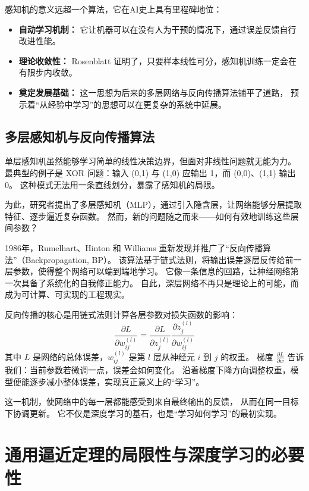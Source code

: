 感知机的意义远超一个算法，它在AI史上具有里程碑地位：
\begin{itemize}
\item {\bf 自动学习机制：} 它让机器可以在没有人为干预的情况下，通过误差反馈自行改进性能。
\item {\bf 理论收敛性：} Rosenblatt 证明了，只要样本线性可分，感知机训练一定会在有限步内收敛。
\item {\bf 奠定发展基础：} 这一思想为后来的多层网络与反向传播算法铺平了道路，  
预示着“从经验中学习”的思想可以在更复杂的系统中延展。
\end{itemize}

\subsection{多层感知机与反向传播算法}

单层感知机虽然能够学习简单的线性决策边界，但面对非线性问题就无能为力。  
最典型的例子是 XOR 问题：输入 (0,1) 与 (1,0) 应输出 1，而 (0,0)、(1,1) 输出 0。  
这种模式无法用一条直线划分，暴露了感知机的局限。  

为此，研究者提出了多层感知机（MLP），通过引入隐含层，让网络能够分层提取特征、逐步逼近复杂函数。  
然而，新的问题随之而来——如何有效地训练这些层间参数？  

1986年，Rumelhart、Hinton 和 Williams 重新发现并推广了“反向传播算法”（Backpropagation, BP）。  
该算法基于链式法则，将输出误差逐层反传给前一层参数，使得整个网络可以端到端地学习。  
它像一条信息的回路，让神经网络第一次具备了系统化的自我修正能力。  
自此，深层网络不再只是理论上的可能，而成为可计算、可实现的工程现实。

反向传播的核心是用链式法则计算各层参数对损失函数的影响：  
\begin{equation}
\frac{\partial L}{\partial w_{ij}^{(l)}} = \frac{\partial L}{\partial z_j^{(l)}} \frac{\partial z_j^{(l)}}{\partial w_{ij}^{(l)}}
\end{equation}
其中 $L$ 是网络的总体误差，$w_{ij}^{(l)}$ 是第 $l$ 层从神经元 $i$ 到 $j$ 的权重。  
梯度 $\frac{\partial L}{\partial w}$ 告诉我们：当前参数若微调一点，误差会如何变化。  
沿着梯度下降方向调整权重，模型便能逐步减小整体误差，实现真正意义上的“学习”。  

这一机制，使网络中的每一层都能感受到来自最终输出的反馈，  
从而在同一目标下协调更新。  
它不仅是深度学习的基石，也是“学习如何学习”的最初实现。

\section{通用逼近定理的局限性与深度学习的必要性}

